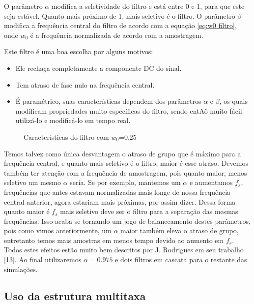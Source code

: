 \documentclass[a4paper, 12pt]{book}
\begin{document}
\indent O parâmetro $\alpha$ modifica a seletividade do filtro e está entre 0 e 1, para que este seja estável. Quanto mais próximo de 1, mais seletivo é o filtro. O parâmetro $\beta$ modifica a frequência central do filtro de acordo com a equação \ref{eq:w0 filtro}, onde $w_0$ é a frequência normalizada de acordo com a amostragem.

\indent Este filtro é uma boa escolha por alguns motivos:
\begin{itemize}
	\item Ele rechaça completamente a componente DC do sinal.
	\item Tem atraso de fase nulo na frequência central.
	\item É paramétrico, suas características dependem dos parâmetros $\alpha$ e $\beta$, os quais modificam propriedades muito específicas do filtro, sendo entAõ muito fácil utilizá-lo e modificá-lo em tempo real.
\end{itemize}

\begin{figure}[h]
	\centering    
	\def\svgwidth{\columnwidth}
	
	\caption{Características do filtro com $w_0$=0.25}
	\label{fig:your image label}
\end{figure}

\indent Temos talvez como única desvantagem o atraso de grupo que é máximo para a frequência central, e quanto mais seletivo é o filtro, maior é esse atraso. Devemos também ter atenção com a frequência de amostragem, pois quanto maior, menos seletivo um mesmo $\alpha$ seria. Se por exemplo, mantemos um $\alpha$ e aumentamos $f_s$, frequências que antes estavam normalizadas mais longe de nossa frequência central anterior, agora estariam mais próximas, por assim dizer. Dessa forma quanto maior é $f_s$ mais seletivo deve ser o filtro para a separação das mesmas frequências. Isso acaba se tornando um jogo de balanceamento destes parâmetros, pois como vimos anteriormente, um $\alpha$ maior também eleva o atraso de grupo, entretanto temos mais amostras em menos tempo devido ao aumento em $f_s$. Todos estes efeitos estão muito bem descritos por J. Rodrigues em seu trabalho [13]. Ao final utilizaremos $\alpha = 0.975$ e dois filtros em cascata para o restante das simulações.

\subsection{Uso da estrutura multitaxa}
\end{document}
